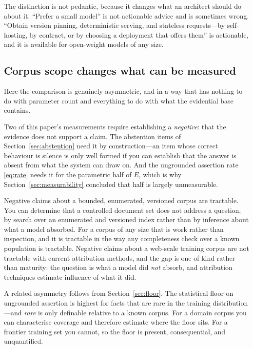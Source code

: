\documentclass[11pt]{article}
\theoremstyle{plain}
\theoremstyle{definition}
\begin{document}
The distinction is not pedantic, because it changes what an architect should do about
it. ``Prefer a small model'' is not actionable advice and is sometimes wrong.
``Obtain version pinning, deterministic serving, and stateless requests---by
self-hosting, by contract, or by choosing a deployment that offers them'' is
actionable, and it is available for open-weight models of any size.

\subsection{Corpus scope changes what can be measured}
\label{sec:corpus-scope}

Here the comparison is genuinely asymmetric, and in a way that has nothing to do with
parameter count and everything to do with what the evidential base contains.

Two of this paper's measurements require establishing a \emph{negative}: that the
evidence does not support a claim. The abstention items of
Section~\ref{sec:abstention} need it by construction---an item whose correct
behaviour is silence is only well formed if you can establish that the answer is
absent from what the system can draw on. And the ungrounded assertion rate
\eqref{eq:rate} needs it for the parametric half of $E$, which is why
Section~\ref{sec:measurability} concluded that half is largely unmeasurable.

Negative claims about a bounded, enumerated, versioned corpus are tractable. You can
determine that a controlled document set does not address a question, by search over
an enumerated and versioned index rather than by inference about what a model
absorbed. For a corpus of any size that is work rather than inspection, and it is
tractable in the way any completeness check over a known population is tractable. Negative claims about a web-scale training corpus are not
tractable with current attribution methods, and the gap is one of kind rather than
maturity: the question is what a model did \emph{not} absorb, and attribution
techniques estimate influence of what it did.

A related asymmetry follows from Section~\ref{sec:floor}. The statistical floor on
ungrounded assertion is highest for facts that are rare in the training
distribution---and \emph{rare} is only definable relative to a known corpus. For a
domain corpus you can characterise coverage and therefore estimate where the floor
sits. For a frontier training set you cannot, so the floor is present, consequential,
and unquantified.
\end{document}
